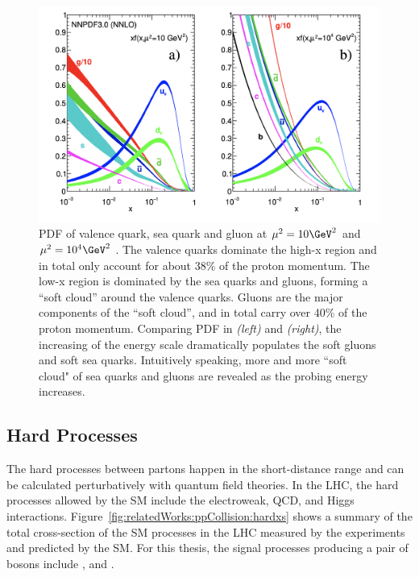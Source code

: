 \begin{figure}[ht]
    \centering
    \includegraphics[width = 0.7 \textwidth]{chapters/RelatedWorks/sectionPPCollision/figures/pdf.png}
    \caption{PDF of valence quark, sea quark and gluon at $\mu^2=10 \GeV^2$ and $\mu^2=10^4 \GeV^2$ \cite{pdg2020}. The valence quarks dominate the high-x region and in total only account for about 38\% of the proton momentum. The low-x region is dominated by the sea quarks and gluons, forming a ``soft cloud'' around the valence quarks. Gluons are the major components of the ``soft cloud'', and in total carry over 40\% of the proton momentum. Comparing PDF in \emph{(left)} and \emph{(right)}, the increasing of the energy scale dramatically populates the soft gluons and soft sea quarks.  Intuitively speaking, more and more ``soft cloud" of sea quarks and gluons are revealed as the probing energy increases.}
    \label{fig:relatedWorks:ppCollision:pdf}
\end{figure}



\subsection{Hard Processes}
\label{sec:relatedWorks:ppCollision:hardProcess} 


The hard processes between partons happen in the short-distance range and can be calculated perturbatively with quantum field theories. In the LHC, the hard processes allowed by the SM include the electroweak, QCD, and Higgs interactions. Figure~\ref{fig:relatedWorks:ppCollision:hardxs} shows a summary of the total cross-section of the SM processes in the LHC measured by the experiments and predicted by the SM. For this thesis, the signal processes producing a pair of \PW bosons include \ttbar, \tW and \PW\PW.


